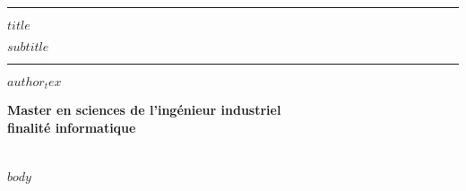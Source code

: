 \documentclass[
    $if(papersize)$
        $papersize$,
    $else$
        a4paper,
    $endif$
    $if(fontsize)$
        $fontsize$,
    $else$
        11pt,
    $endif$
    french,
    oneside
]{report}
\begin{document}
    \sffamily

    \begin{center}
        \rule{\textwidth}{1pt}
        {\LARGE\bfseries
            $title$ \par
        }
        \vspace{\baselineskip}
        {\Large\bfseries
            $subtitle$
        }
        \rule{\textwidth}{1pt}
    \end{center}

    \vspace{1em}

    \begin{center}
        {\Large
            $author_tex$
        }
    \end{center}

    \vspace{1em}

    \begin{center}
        {\large
            \textbf{
                Master en sciences de l'ingénieur industriel \\
                finalité informatique
            }
        }
    \end{center}

    \vspace{2em}

    \section*{\sffamily\abstractname}

    $body$
\end{document}
